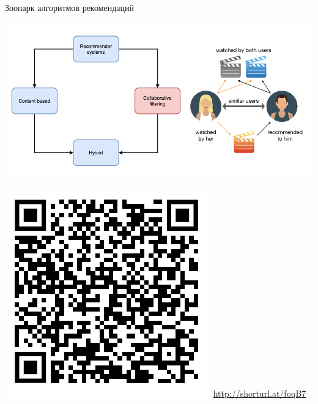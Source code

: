 \documentclass[11pt,aspectratio=169,handout]{beamer}
\begin{document}
\begin{frame}{Зоопарк алгоритмов рекомендаций \cite{ali_2021}}

\begin{center}
\includegraphics[scale=0.27]{images/taxonomy-3.png}
\end{center}

\includegraphics[scale=0.3]{images/poll.png} \hfill \url{http://shorturl.at/foqB7}

\end{frame}
\end{document}
